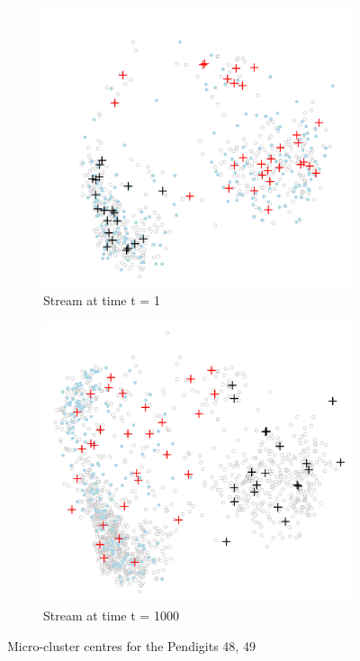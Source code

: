 \begin{figure}
\begin{subfigure}{.5\textwidth}
  \centering
  \includegraphics[width=\textwidth]{evolving_pen/evolving_pen_48_49_1_crop.png}  
  \caption{Stream at time t = 1}
  \label{fig:stream_1}
\end{subfigure}
\begin{subfigure}{.5\textwidth}
  \centering
  \includegraphics[width=\textwidth]{evolving_pen/evolving_pen_48_49_100_crop.png}  
  \caption{Stream at time t = 1000 }
  \label{fig:stream_1000}
\end{subfigure}
\caption{Micro-cluster centres for the Pendigits 48, 49}
\label{stream_1_100}
\end{figure}

